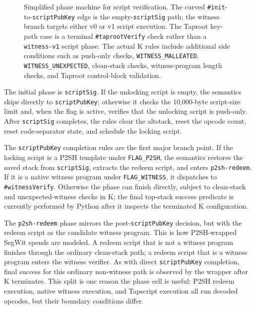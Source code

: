 \documentclass[conference]{IEEEtran}
\begin{document}
\begin{figure}[t]
{%
  }
  \caption{Simplified phase machine for script verification.  The curved
  \texttt{\#init}-to-\texttt{scriptPubKey} edge is the empty-\texttt{scriptSig}
  path; the witness branch targets either v0 or v1 script execution.  The
  Taproot key-path case is a terminal \texttt{\#taprootVerify} check rather than
  a \texttt{witness-v1} script phase.  The actual K rules include additional
  side conditions such as push-only checks,
  \texttt{WITNESS\_MALLEATED}, \texttt{WITNESS\_UNEXPECTED}, clean-stack checks,
  witness-program length checks, and Taproot control-block validation.}
  \label{fig:phase-flow}
\end{figure}

The initial phase is \texttt{scriptSig}.  If the unlocking script is empty,
the semantics skips directly to \texttt{scriptPubKey}; otherwise it checks the
10,000-byte script-size limit and, when the flag is active, verifies that the
unlocking script is push-only.  After \texttt{scriptSig} completes, the rules
clear the altstack, reset the opcode count, reset code-separator state, and
schedule the locking script.

The \texttt{scriptPubKey} completion rules are the first major branch point.
If the locking script is a P2SH template under \texttt{FLAG\_P2SH}, the
semantics restores the saved stack from \texttt{scriptSig}, extracts the
redeem script, and enters \texttt{p2sh-redeem}.  If it is a native witness
program under \texttt{FLAG\_WITNESS}, it dispatches to
\texttt{\#witnessVerify}.  Otherwise the phase can finish directly, subject to
clean-stack and unexpected-witness checks in K; the final top-stack success
predicate is currently performed by Python after it inspects the terminated K
configuration.

The \texttt{p2sh-redeem} phase mirrors the post-\texttt{scriptPubKey}
decision, but with the redeem script as the candidate witness program.  This
is how P2SH-wrapped SegWit spends are modeled.  A redeem script that is not a
witness program finishes through the ordinary clean-stack path; a redeem
script that is a witness program enters the witness verifier.  As with direct
\texttt{scriptPubKey} completion, final success for this ordinary non-witness
path is observed by the wrapper after K terminates.  This split is
one reason the phase cell is useful: P2SH redeem execution, native witness
execution, and Tapscript execution all run decoded opcodes, but their boundary
conditions differ.
\end{document}
